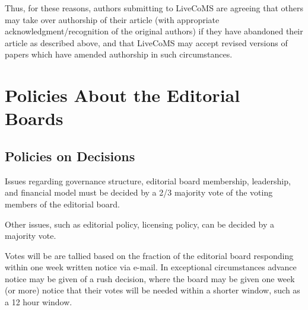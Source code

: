 \documentclass{article}
\begin{document}
Thus, for these reasons, authors submitting to LiveCoMS are agreeing
that others may take over authorship of their article (with
appropriate acknowledgment/recognition of the original authors) if
they have abandoned their article as described above, and that
LiveCoMS may accept revised versions of papers which have amended
authorship in such circumstances.

\section{Policies About the Editorial Boards}

\subsection{Policies on Decisions}
Issues regarding governance structure, editorial board membership, leadership, and financial
model must be decided by a 2/3 majority vote of the voting members of the editorial
board.

Other issues, such as editorial policy, licensing policy, can be
decided by a majority vote.

Votes will be are tallied based on the fraction of the editorial board
responding within one week written notice via e-mail. In exceptional
circumstances advance notice may be given of a rush decision, where
the board may be given one week (or more) notice that their votes will
be needed within a shorter window, such as a 12 hour window.
\end{document}
